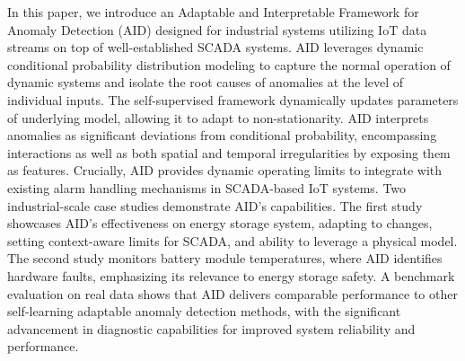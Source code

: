 In this paper, we introduce an Adaptable and Interpretable Framework for Anomaly Detection (AID) designed for industrial systems utilizing IoT data streams on top of well-established SCADA systems. AID leverages dynamic conditional probability distribution modeling to capture the normal operation of dynamic systems and isolate the root causes of anomalies at the level of individual inputs. The self-supervised framework dynamically updates parameters of underlying model, allowing it to adapt to non-stationarity. AID interprets anomalies as significant deviations from conditional probability, encompassing interactions as well as both spatial and temporal irregularities by exposing them as features. Crucially, AID provides dynamic operating limits to integrate with existing alarm handling mechanisms in SCADA-based IoT systems. Two industrial-scale case studies demonstrate AID's capabilities. The first study showcases AID's effectiveness on energy storage system, adapting to changes, setting context-aware limits for SCADA, and ability to leverage a physical model. The second study monitors battery module temperatures, where AID identifies hardware faults, emphasizing its relevance to energy storage safety. A benchmark evaluation on real data shows that AID delivers comparable performance to other self-learning adaptable anomaly detection methods, with the significant advancement in diagnostic capabilities for improved system reliability and performance.
